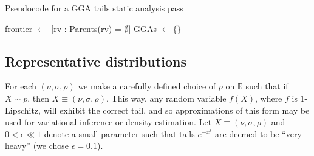\documentclass{article}
\theoremstyle{definition}
\begin{document}

\begin{algorithm}
	\caption{Pseudocode for a GGA tails static analysis pass}\label{alg:bfs_typecheck}
	frontier $\gets$ [rv : Parents(rv) = $\emptyset$]\;
	GGAs $\gets \{\}$\;
\end{algorithm}


\subsection{Representative distributions}\label{ssec:repr_dist}

For each $(\nu,\sigma,\rho)$ we make a carefully defined choice of $p$ on $\mathbb{R}$ such that if $X \sim p$, then $X \equiv (\nu,\sigma,\rho)$. This way, any random variable $f(X)$, where $f$ is $1$-Lipschitz, will exhibit the correct tail, and so approximations of this form may be used for variational inference or density estimation. Let $X \equiv (\nu,\sigma,\rho)$ and $0 < \epsilon \ll 1$ denote a small parameter such that tails $e^{-x^\epsilon}$ are deemed to be ``very heavy'' (we chose $\epsilon = 0.1$). %
\end{document}

